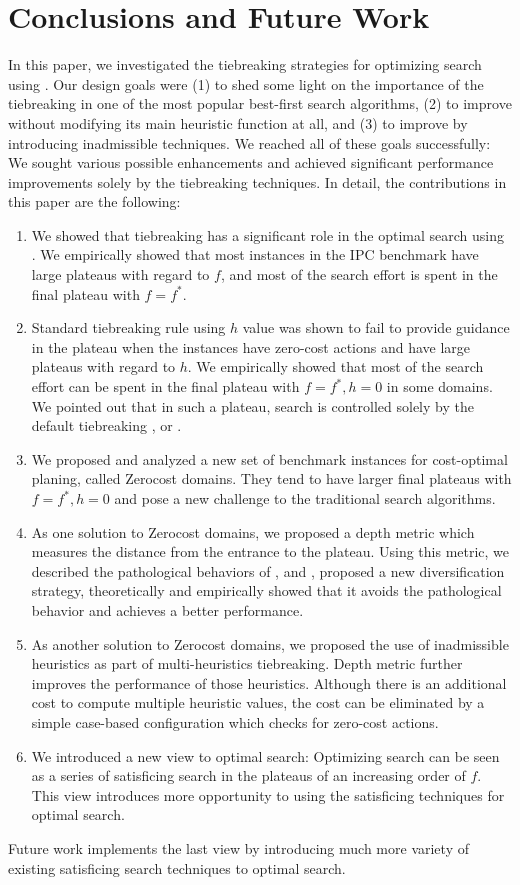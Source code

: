 
\section{Conclusions and Future Work}

In this paper, we investigated the tiebreaking strategies for optimizing search using \astar.  Our design goals
were (1) to shed some light on the importance of the tiebreaking in one of the most popular best-first search
algorithms, (2) to improve \astar without modifying its main heuristic function at all, and (3) to
improve \astar by introducing inadmissible techniques. We reached all of these goals successfully: We sought
various possible enhancements and achieved significant performance improvements solely by the tiebreaking
techniques. In detail, the contributions in this paper are the following:

\begin{enumerate}
 \item We showed that tiebreaking has a significant role in the optimal
       search using \astar. We empirically showed that most instances in the IPC
       benchmark have large plateaus with regard to $f$, and most of the
       search effort is spent in the final plateau with $f=f^*$.
 \item Standard tiebreaking rule using $h$ value was shown to fail to
       provide guidance in the plateau when the instances have zero-cost
       actions and have large plateaus with regard to $h$.
       We empirically showed that most of the search effort can be spent in
       the final plateau with $f=f^*, h=0$ in some domains. We pointed out that in such
       a plateau, search is controlled solely by the
       default tiebreaking \fifo, \lifo or \ro.
 \item We proposed and analyzed a new set of benchmark instances for cost-optimal planing, called Zerocost domains.
       They tend to have larger final plateaus with $f=f^*, h=0$ and pose a new challenge to the traditional search
       algorithms.
 \item As one solution to Zerocost domains, we proposed a depth metric
       which measures the distance from the entrance to the
       plateau. Using this metric, we described the pathological
       behaviors of \fifo, \lifo and \ro, proposed a new diversification
       strategy, theoretically and empirically showed that it avoids the
       pathological behavior and achieves a better performance.
 \item As another solution to Zerocost domains, we proposed the use of
       inadmissible heuristics as part of multi-heuristics tiebreaking.
       Depth metric further improves the performance of those
       heuristics. Although there is an additional cost to compute
       multiple heuristic values, the cost can be eliminated by a simple
       case-based configuration which checks for zero-cost actions.
 \item We introduced a new view to optimal \astar search: Optimizing search can be seen as a series of satisficing
       search in the plateaus of an increasing order of $f$. This view introduces more opportunity to using the
       satisficing techniques for optimal search.
\end{enumerate}

Future work implements the last view by introducing much more variety of
existing satisficing search techniques to optimal search.
